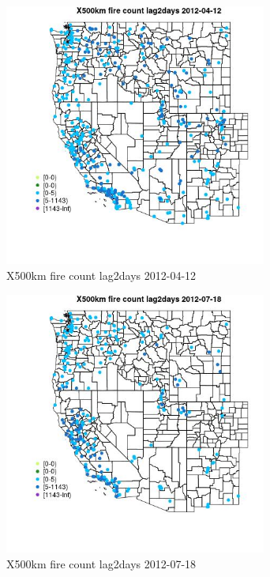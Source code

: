 \begin{figure} 
\centering  
\includegraphics[width=0.77\textwidth]{Code_Outputs/Report_ML_input_PM25_Step4_part_e_de_duplicated_aves_compiled_2019-05-14wNAs_MapObsX500km_fire_count_lag2days2012-04-12.jpg} 
\caption{\label{fig:Report_ML_input_PM25_Step4_part_e_de_duplicated_aves_compiled_2019-05-14wNAsMapObsX500km_fire_count_lag2days2012-04-12}X500km fire count lag2days 2012-04-12} 
\end{figure} 
 

\begin{figure} 
\centering  
\includegraphics[width=0.77\textwidth]{Code_Outputs/Report_ML_input_PM25_Step4_part_e_de_duplicated_aves_compiled_2019-05-14wNAs_MapObsX500km_fire_count_lag2days2012-07-18.jpg} 
\caption{\label{fig:Report_ML_input_PM25_Step4_part_e_de_duplicated_aves_compiled_2019-05-14wNAsMapObsX500km_fire_count_lag2days2012-07-18}X500km fire count lag2days 2012-07-18} 
\end{figure} 
 

